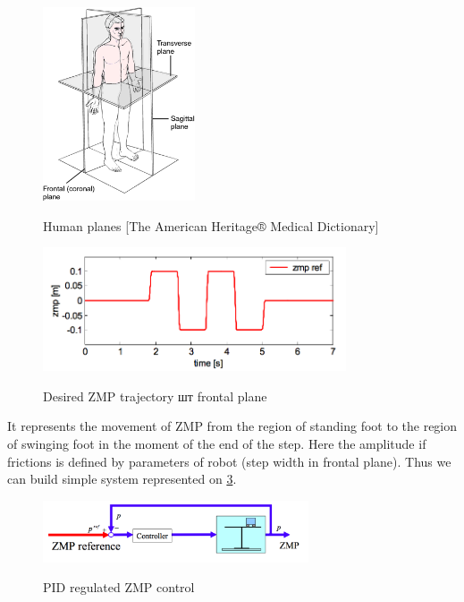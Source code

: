 \documentclass[12pt,a4paper]{report}
\begin{document}
		\begin{figure}[h!]
			\vspace{-0.2cm}
			\centering
			{\includegraphics[width=0.4\textwidth]{7}}
			\caption{Human planes [The American Heritage® Medical Dictionary]}
			\label{fig:7}
			\vspace{-0.1cm}
		\end{figure}
		\begin{figure}[h!]
			\vspace{-0.2cm}
			\centering
			{\includegraphics[width=0.8\textwidth]{8}}
			\caption{Desired ZMP trajectory шт frontal plane \cite{kajita2003biped}}
			\label{fig:8}
			\vspace{-0.1cm}
		\end{figure}
		It represents the movement of ZMP from the region of standing foot to the region of swinging foot in the moment of the end of the step. Here the amplitude if frictions is defined by parameters of robot (step width in frontal plane). Thus we can build simple system represented on \cref{fig:9}.
		\begin{figure}[h!]
			\vspace{-0.2cm}
			\centering
			{\includegraphics[width=0.7\textwidth]{9}}
			\caption{PID regulated ZMP control \cite{kajita2003biped}}
			\label{fig:9}
			\vspace{-0.1cm}
		\end{figure}
\end{document}
